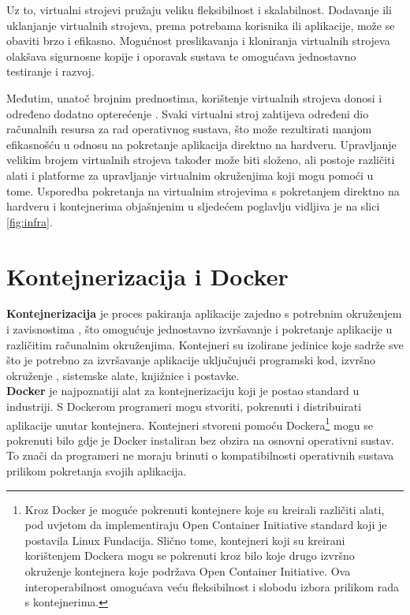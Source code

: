 \documentclass[times, utf8, diplomski]{fer}
\begin{document}
Uz to, virtualni strojevi pružaju veliku fleksibilnost i skalabilnost. Dodavanje ili uklanjanje virtualnih strojeva, prema potrebama korisnika ili aplikacije, može se obaviti brzo i efikasno. Mogućnost preslikavanja  i kloniranja virtualnih strojeva olakšava sigurnosne kopije  i oporavak sustava te omogućava jednostavno testiranje i razvoj.

Međutim, unatoč brojnim prednostima, korištenje virtualnih strojeva donosi i određeno dodatno opterećenje . Svaki virtualni stroj zahtijeva određeni dio računalnih resursa za rad operativnog sustava, što može rezultirati manjom efikasnošću u odnosu na pokretanje aplikacija direktno na hardveru. Upravljanje velikim brojem virtualnih strojeva također može biti složeno, ali postoje različiti alati i platforme za upravljanje virtualnim okruženjima koji mogu pomoći u tome. Usporedba pokretanja na virtualnim strojevima s pokretanjem direktno na hardveru i kontejnerima objašnjenim u sljedećem poglavlju vidljiva je na slici \ref{fig:infra}.

\section{Kontejnerizacija i Docker}
\label{sec:docker}

\textbf{Kontejnerizacija}  je proces pakiranja aplikacije zajedno s potrebnim okruženjem i zavisnostima , što omogućuje jednostavno izvršavanje i pokretanje aplikacije u različitim računalnim okruženjima. Kontejneri su izolirane jedinice koje sadrže sve što je potrebno za izvršavanje aplikacije uključujući programski kod, izvršno okruženje , sistemske alate, knjižnice  i postavke. \\

\textbf{Docker} je najpoznatiji alat za kontejnerizaciju koji je postao standard u industriji. S Dockerom programeri mogu stvoriti, pokrenuti i distribuirati aplikacije unutar kontejnera. Kontejneri stvoreni pomoću Dockera\footnote{Kroz Docker je moguće pokrenuti kontejnere koje su kreirali različiti alati, pod uvjetom da implementiraju Open Container Initiative standard koji je postavila Linux Fundacija. Slično tome, kontejneri koji su kreirani korištenjem Dockera mogu se pokrenuti kroz bilo koje drugo izvršno okruženje kontejnera koje podržava Open Container Initiative. Ova interoperabilnost omogućava veću fleksibilnost i slobodu izbora prilikom rada s kontejnerima.} mogu se pokrenuti bilo gdje je Docker instaliran bez obzira na osnovni operativni sustav. To znači da programeri ne moraju brinuti o kompatibilnosti operativnih sustava prilikom pokretanja svojih aplikacija.
\end{document}
